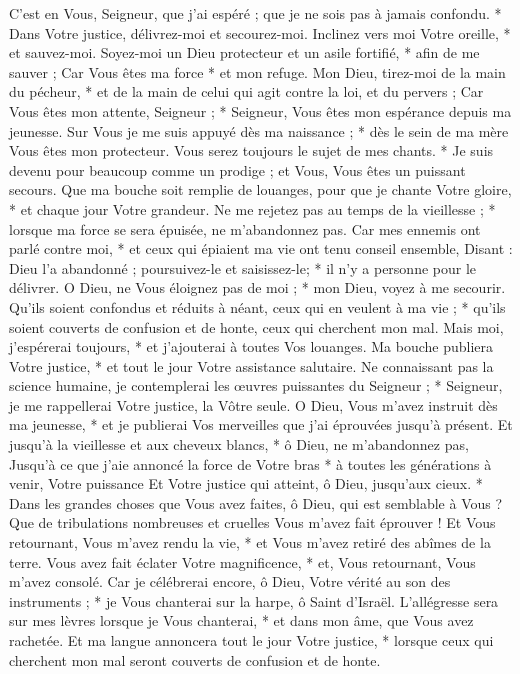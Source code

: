  C'est en Vous, Seigneur, que j'ai espéré ; que je ne sois pas à jamais confondu. * Dans Votre justice, délivrez-moi et secourez-moi.
\versseparator
 Inclinez vers moi Votre oreille, * et sauvez-moi.
\versseparator
 Soyez-moi un Dieu protecteur et un asile fortifié, * afin de me sauver ;
\versseparator
 Car Vous êtes ma force * et mon refuge.
\versseparator
 Mon Dieu, tirez-moi de la main du pécheur, * et de la main de celui qui agit contre la loi, et du pervers ;
\versseparator
 Car Vous êtes mon attente, Seigneur ; * Seigneur, Vous êtes mon espérance depuis ma jeunesse.
\versseparator
 Sur Vous je me suis appuyé dès ma naissance ; * dès le sein de ma mère Vous êtes mon protecteur.
\versseparator
 Vous serez toujours le sujet de mes chants. * Je suis devenu pour beaucoup comme un prodige ; et Vous, Vous êtes un puissant secours.
\versseparator
 Que ma bouche soit remplie de louanges, pour que je chante Votre gloire, * et chaque jour Votre grandeur.
\versseparator
 Ne me rejetez pas au temps de la vieillesse ; * lorsque ma force se sera épuisée, ne m'abandonnez pas.
\versseparator
 Car mes ennemis ont parlé contre moi, * et ceux qui épiaient ma vie ont tenu conseil ensemble,
\versseparator
 Disant : Dieu l'a abandonné ; poursuivez-le et saisissez-le; * il n'y a personne pour le délivrer.
\versseparator
 O Dieu, ne Vous éloignez pas de moi ; * mon Dieu, voyez à me secourir.
\versseparator
 Qu'ils soient confondus et réduits à néant, ceux qui en veulent à ma vie ; * qu'ils soient couverts de confusion et de honte, ceux qui cherchent mon mal.
\versseparator
 Mais moi, j'espérerai toujours, * et j'ajouterai à toutes Vos louanges.
\versseparator
 Ma bouche publiera Votre justice, * et tout le jour Votre assistance salutaire.
\versseparator
 Ne connaissant pas la science humaine, je contemplerai les œuvres puissantes du Seigneur ; * Seigneur, je me rappellerai Votre justice, la Vôtre seule.
\versseparator
 O Dieu, Vous m'avez instruit dès ma jeunesse, * et je publierai Vos merveilles que j'ai éprouvées jusqu'à présent.
\versseparator
 Et jusqu'à la vieillesse et aux cheveux blancs, * ô Dieu, ne m'abandonnez pas,
\versseparator
 Jusqu'à ce que j'aie annoncé la force de Votre bras * à toutes les générations à venir, Votre puissance
\versseparator
 Et Votre justice qui atteint, ô Dieu, jusqu'aux cieux. * Dans les grandes choses que Vous avez faites, ô Dieu, qui est semblable à Vous ?
\versseparator
 Que de tribulations nombreuses et cruelles Vous m'avez fait éprouver ! Et Vous retournant, Vous m'avez rendu la vie, * et Vous m'avez retiré des abîmes de la terre.
\versseparator
 Vous avez fait éclater Votre magnificence, * et, Vous retournant, Vous m'avez consolé.
\versseparator
 Car je célébrerai encore, ô Dieu, Votre vérité au son des instruments ; * je Vous chanterai sur la harpe, ô Saint d'Israël.
\versseparator
 L'allégresse sera sur mes lèvres lorsque je Vous chanterai, * et dans mon âme, que Vous avez rachetée.
\versseparator
 Et ma langue annoncera tout le jour Votre justice, * lorsque ceux qui cherchent mon mal seront couverts de confusion et de honte.